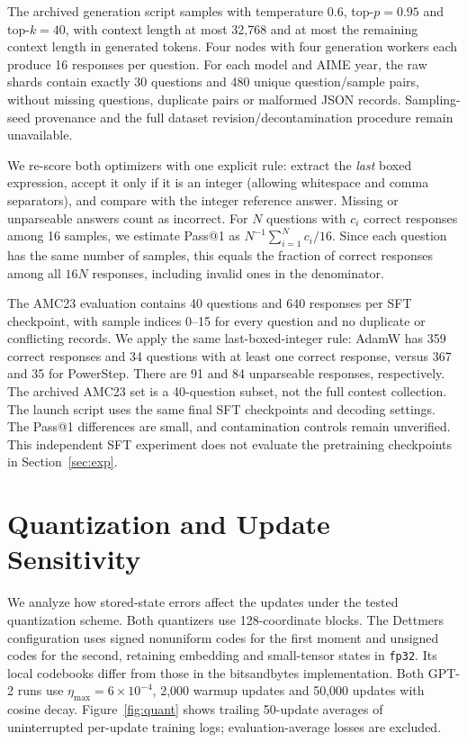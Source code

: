 \documentclass{article}
\begin{document}
The archived generation script samples with temperature 0.6, top-$p=0.95$ and top-$k=40$, with context length at most 32,768 and at most the remaining context length in generated tokens. Four nodes with four generation workers each produce 16 responses per question. For each model and AIME year, the raw shards contain exactly 30 questions and 480 unique question/sample pairs, without missing questions, duplicate pairs or malformed JSON records. Sampling-seed provenance and the full dataset revision/decontamination procedure remain unavailable.

We re-score both optimizers with one explicit rule: extract the \emph{last} boxed expression, accept it only if it is an integer (allowing whitespace and comma separators), and compare with the integer reference answer. Missing or unparseable answers count as incorrect. For $N$ questions with $c_i$ correct responses among 16 samples, we estimate Pass@1 as $N^{-1}\sum_{i=1}^{N}c_i/16$. Since each question has the same number of samples, this equals the fraction of correct responses among all $16N$ responses, including invalid ones in the denominator.

The AMC23 evaluation contains 40 questions and 640 responses per SFT checkpoint, with sample indices 0--15 for every question and no duplicate or conflicting records. We apply the same last-boxed-integer rule: AdamW has 359 correct responses and 34 questions with at least one correct response, versus 367 and 35 for PowerStep. There are 91 and 84 unparseable responses, respectively. The archived AMC23 set is a 40-question subset, not the full contest collection. The launch script uses the same final SFT checkpoints and decoding settings. The Pass@1 differences are small, and contamination controls remain unverified. This independent SFT experiment does not evaluate the pretraining checkpoints in Section~\ref{sec:exp}.


\FloatBarrier
\section{Quantization and Update Sensitivity}
\label{sec:quantization-analysis}
We analyze how stored-state errors affect the updates under the tested quantization scheme. Both quantizers use 128-coordinate blocks. The Dettmers configuration uses signed nonuniform codes for the first moment and unsigned codes for the second, retaining embedding and small-tensor states in \texttt{fp32}. Its local codebooks differ from those in the bitsandbytes implementation. Both GPT-2 runs use $\eta_{\max}=6\times10^{-4}$, 2,000 warmup updates and 50,000 updates with cosine decay. Figure~\ref{fig:quant} shows trailing 50-update averages of uninterrupted per-update training logs; evaluation-average losses are excluded.
\end{document}

